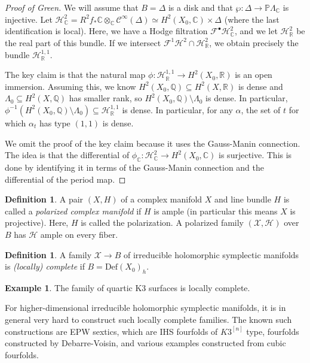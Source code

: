 \documentclass[leqno, openany]{memoir}
\theoremstyle{definition}
\newtheorem{defn}[thm]{Definition}
\newtheorem{exm}[thm]{Example}
\theoremstyle{remark}
\theoremstyle{plain}
\theoremstyle{definition}
\theoremstyle{remark}
\newcommand{\R}{\mathbb{R}}
\newcommand{\C}{\mathbb{C}}
\newcommand{\Q}{\mathbb{Q}}
\renewcommand{\P}{\mathbb{P}}
\newcommand{\mc}[1]{\mathcal{#1}}
\newcommand{\mr}[1]{\mathrm{#1}}
\begin{document}
\begin{proof}[Proof of Green]
    We will assume that $B = \Delta$ is a disk and that $\wp \colon \Delta \to \P \Lambda_{\C}$ is injective. Let $\mc{H}^2_{\C} = R^2 f_* \C \otimes_{\C} \mc{C}^{\infty}(\Delta) \simeq H^2(X_0, \C) \times \Delta$ (where the last identification is local). Here, we have a Hodge filtration $\mc{F}^{\bullet} \mc{H}^2_{\C}$, and we let $\mc{H}^2_{\R}$ be the real part of this bundle. If we intersect $\mc{F}^1 \mc{H}^2 \cap \mc{H}^2_{\R}$, we obtain precisely the bundle $\mc{H}^{1,1}_{\R}$.

    The key claim is that the natural map $\phi \colon \mc{H}^{1,1}_{\R} \to H^2(X_0, \R)$ is an open immersion. Assuming this, we know $H^2(X_0, \Q) \subseteq H^2(X, \R)$ is dense and $\Lambda_0 \subseteq H^2(X, \Q)$ has smaller rank, so $H^2(X_0, \Q) \setminus \Lambda_0$ is dense. In particular, $\phi^{-1}(H^2(X_0, \Q) \setminus \Lambda_0) \subseteq \mc{H}^{1,1}_{\R}$ is dense. In particular, for any $\alpha$, the set of $t$ for which $\alpha_t$ has type $(1,1)$ is dense.

    We omit the proof of the key claim because it uses the Gauss-Manin connection. The idea is that the differential of $\phi_{\C} \colon \mc{H}^2_{\C} \to H^2(X_0, \C)$ is surjective. This is done by identifying it in terms of the Gauss-Manin connection and the differential of the period map.
\end{proof}

\begin{defn}
    A pair $(X, H)$ of a complex manifold $X$ and line bundle $H$ is called a \textit{polarized complex manifold} if $H$ is ample (in particular this means $X$ is projective). Here, $H$ is called the polarization. A polarized family $(\mc{X}, \mc{H})$ over $B$ has $\mc{H}$ ample on every fiber.
\end{defn}

\begin{defn}
    A family $\mc{X} \to B$ of irreducible holomorphic symplectic manifolds is \textit{(locally) complete} if $B = \mr{Def}(X_0)_h$.
\end{defn}

\begin{exm}
    The family of quartic K3 surfaces is locally complete.
\end{exm}

For higher-dimensional irreducible holomorphic symplectic manifolds, it is in general very hard to construct such locally complete families. The known such constructions are EPW sextics, which are IHS fourfolds of $K3^{[n]}$ type, fourfolds constructed by Debarre-Voisin, and various examples constructed from cubic fourfolds.
\end{document}
